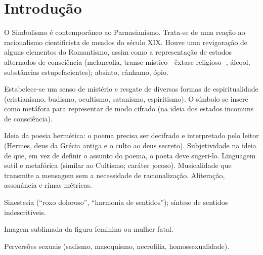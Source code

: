 
\chapter{Introdução}

O Simbolismo é contemporâneo ao Parnasianismo. Trata-se de uma reação ao racionalismo cientificista de meados do século XIX. Houve uma revigoração de alguns elementos do Romantismo, assim como a representação de estados alternados de consciência (melancolia, transe místico - êxtase religioso -, álcool, substâncias estupefacientes); absinto, cânhamo, ópio.

Estabelece-se um senso de mistério e resgate de diversas formas de espiritualidade (cristianismo, budismo, ocultismo, satanismo, espiritismo). O símbolo se insere como metáfora para representar de modo cifrado (na ideia dos estados incomuns de consciência).

Ideia da poesia hermética: o poema precisa ser decifrado e interpretado pelo leitor (Hermes, deus da Grécia antiga e o culto ao deus secreto). Subjetividade na ideia de que, em vez de definir o assunto do poema, o poeta deve sugeri-lo. Linguagem sutil e metafórica (similar ao Cultismo; caráter jocoso). Musicalidade que transmite a mensagem sem a necessidade de racionalização. Aliteração, assonância e rimas métricas.

Sinestesia (``roxo doloroso'', ``harmonia de sentidos''); síntese de sentidos indescritíveis.

Imagem sublimada da figura feminina ou mulher fatal.

Perversões sexuais (sadismo, masoquismo, necrofilia, homossexualidade).